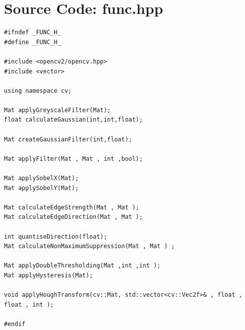 \documentclass[12pt,a4paper]{report}
\begin{document}
\chapter{Source Code: func.hpp}
\begin{lstlisting}
#ifndef _FUNC_H_
#define _FUNC_H_

#include <opencv2/opencv.hpp>
#include <vector>

using namespace cv;

Mat applyGreyscaleFilter(Mat);
float calculateGaussian(int,int,float);

Mat createGaussianFilter(int,float);

Mat applyFilter(Mat , Mat , int ,bool);

Mat applySobelX(Mat);
Mat applySobelY(Mat);

Mat calculateEdgeStrength(Mat , Mat );
Mat calculateEdgeDirection(Mat , Mat );

int quantiseDirection(float);
Mat calculateNonMaximumSuppression(Mat , Mat ) ;

Mat applyDoubleThresholding(Mat ,int ,int );
Mat applyHysteresis(Mat);

void applyHoughTransform(cv::Mat, std::vector<cv::Vec2f>& , float , float , int );

#endif
\end{lstlisting}
\end{document}
